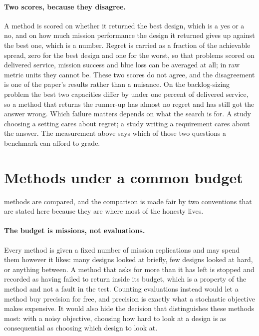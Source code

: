 \documentclass[11pt]{article}
\begin{document}
\paragraph{Two scores, because they disagree.} A method is scored on whether it returned the best
design, which is a yes or a no, and on how much mission performance the design it returned gives up
against the best one, which is a number. Regret is carried as a fraction of the achievable spread,
zero for the best design and one for the worst, so that problems scored on delivered service,
mission success and blue loss can be averaged at all; in raw metric units they cannot be. These two
scores do not agree, and the disagreement is one of the paper's results rather than a nuisance. On
the backlog-sizing problem the best two capacities differ by under one percent of delivered service,
so a method that returns the runner-up has almost no regret and has still got the answer wrong.
Which failure matters depends on what the search is for. A study choosing a setting cares about
regret; a study writing a requirement cares about the answer. The measurement above says which of
those two questions a benchmark can afford to grade.

\section{Methods under a common budget}
\label{sec:methods}

\BnMethods{} methods are compared, and the comparison is made fair by two conventions that are
stated here because they are where most of the honesty lives.

\paragraph{The budget is missions, not evaluations.} Every method is given a fixed number of mission
replications and may spend them however it likes: many designs looked at briefly, few designs looked
at hard, or anything between. A method that asks for more than it has left is stopped and recorded
as having failed to return inside its budget, which is a property of the method and not a fault in
the test. Counting evaluations instead would let a method buy precision for free, and precision is
exactly what a stochastic objective makes expensive. It would also hide the decision that
distinguishes these methods most: with a noisy objective, choosing how hard to look at a design is
as consequential as choosing which design to look at.
\end{document}

